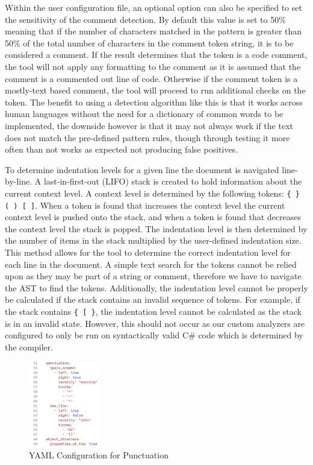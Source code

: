 Within the user configuration file, an optional option can also be specified to set the sensitivity of the comment detection. By default this value is set to 50\% meaning that if the number of characters matched in the pattern is greater than 50\% of the total number of characters in the comment token string, it is to be considered a comment. If the result determines that the token is a code comment, the tool will not apply any formatting to the comment as it is assumed that the comment is a commented out line of code. Otherwise if the comment token is a mostly-text based comment, the tool will proceed to run additional checks on the token. The benefit to using a detection algorithm like this is that it works across human languages without the need for a dictionary of common words to be implemented, the downside however is that it may not always work if the text does not match the pre-defined pattern rules, though through testing it more often than not works as expected not producing false positives.

To determine indentation levels for a given line the document is navigated line-by-line. A last-in-first-out (LIFO) stack is created to hold information about the current context level. A context level is determined by the following tokens: \texttt{\{ \} ( ) [ ]}. When a token is found that increases the context level the current context level is pushed onto the stack, and when a token is found that decreases the context level the stack is popped. The indentation level is then determined by the number of items in the stack multiplied by the user-defined indentation size. This method allows for the tool to determine the correct indentation level for each line in the document.
A simple text search for the tokens cannot be relied upon as they may be part of a string or comment, therefore we have to navigate the AST to find the tokens. Additionally, the indentation level cannot be properly be calculated if the stack contains an invalid sequence of tokens. For example, if the stack contains \texttt{\{ [ \}}, the indentation level cannot be calculated as the stack is in an invalid state. However, this should not occur as our custom analyzers are configured to only be run on syntactically valid C\# code which is determined by the compiler.


\begin{figure}
    \centering
    \caption{YAML Configuration for Punctuation}
    \label{fig:YAMLPunctuation}
    \includegraphics[width=0.275\textwidth]{Figures/YAMLConfigurationPunctuation.png}
\end{figure}

